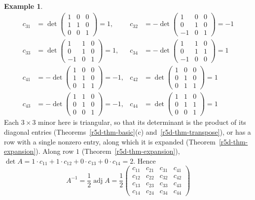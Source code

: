 \documentclass[12pt]{article}
\theoremstyle{definition}
\newtheorem{example}[theorem]{Example}
\begin{document}
\begin{example}
\[\begin{aligned}
c_{31}&=\det\left(\begin{smallmatrix}1&0&0\\1&1&0\\0&0&1\end{smallmatrix}\right)=1,&
c_{32}&=-\det\left(\begin{smallmatrix}1&0&0\\0&1&0\\-1&0&1\end{smallmatrix}\right)=-1\\
c_{33}&=\det\left(\begin{smallmatrix}1&1&0\\0&1&0\\-1&0&1\end{smallmatrix}\right)=1,&
c_{34}&=-\det\left(\begin{smallmatrix}1&1&0\\0&1&1\\-1&0&0\end{smallmatrix}\right)=1\\
c_{41}&=-\det\left(\begin{smallmatrix}1&0&0\\1&1&0\\0&1&1\end{smallmatrix}\right)=-1,&
c_{42}&=\det\left(\begin{smallmatrix}1&0&0\\0&1&0\\0&1&1\end{smallmatrix}\right)=1\\
c_{43}&=-\det\left(\begin{smallmatrix}1&1&0\\0&1&0\\0&0&1\end{smallmatrix}\right)=-1,&
c_{44}&=\det\left(\begin{smallmatrix}1&1&0\\0&1&1\\0&0&1\end{smallmatrix}\right)=1
\end{aligned}
\]
Each \(3\times3\) minor here is triangular, so that its determinant is the product of its diagonal entries
(Theorems~\ref{r5d-thm-basic}(c) and~\ref{r5d-thm-transpose}), or has a row with a single nonzero entry, along
which it is expanded (Theorem~\ref{r5d-thm-expansion}). Along row \(1\) (Theorem~\ref{r5d-thm-expansion}),
\(\det A=1\cdot c_{11}+1\cdot c_{12}+0\cdot c_{13}+0\cdot c_{14}=2\). Hence
\[
A^{-1}=\frac12\operatorname{adj}A
=\frac12\begin{pmatrix}c_{11}&c_{21}&c_{31}&c_{41}\\c_{12}&c_{22}&c_{32}&c_{42}\\c_{13}&c_{23}&c_{33}&c_{43}\\c_{14}&c_{24}&c_{34}&c_{44}\end{pmatrix}
\]
\end{example}
\end{document}
